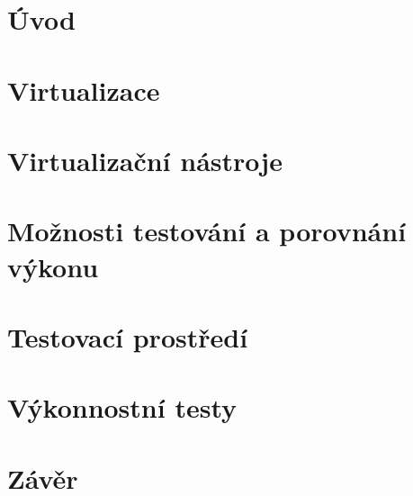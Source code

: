 \chapter{Úvod}


\chapter{Virtualizace}


\chapter{Virtualizační nástroje}


\chapter{Možnosti testování a porovnání výkonu}


\chapter{Testovací prostředí}


\chapter{Výkonnostní testy}


\chapter{Závěr}

